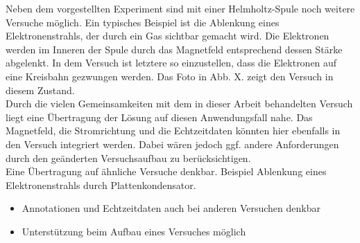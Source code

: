 Neben dem vorgestellten Experiment sind mit einer Helmholtz-Spule noch weitere Versuche möglich. Ein typisches Beispiel ist die Ablenkung eines Elektronenstrahls, der durch ein Gas sichtbar gemacht wird. Die Elektronen werden im Inneren der Spule durch das Magnetfeld entsprechend dessen Stärke abgelenkt. In dem Versuch ist letztere so einzustellen, dass die Elektronen auf eine Kreisbahn gezwungen werden. Das Foto in Abb. X. zeigt den Versuch in diesem Zustand.\\

Durch die vielen Gemeinsamkeiten mit dem in dieser Arbeit behandelten Versuch liegt eine Übertragung der Lösung auf diesen Anwendungsfall nahe. Das Magnetfeld, die Stromrichtung und die Echtzeitdaten könnten hier ebenfalls in den Versuch integriert werden. Dabei wären jedoch ggf. andere Anforderungen durch den geänderten Versuchsaufbau zu berücksichtigen.\\

Eine Übertragung auf ähnliche Versuche denkbar. Beispiel Ablenkung eines Elektronenstrahls durch Plattenkondensator.


\begin{itemize}
	\item Annotationen und Echtzeitdaten auch bei anderen Versuchen denkbar
	\item Unterstützung beim Aufbau eines Versuches möglich
\end{itemize}
	
	
	
	
	
	
	
	
	
	
	
	
	
	